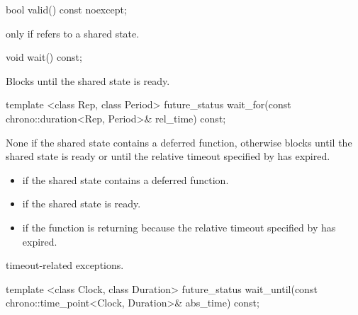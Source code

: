 %
\begin{itemdecl}
bool valid() const noexcept;
\end{itemdecl}

\begin{itemdescr}
\pnum
\returns {} only if  refers to a shared state.
\end{itemdescr}

%
\begin{itemdecl}
void wait() const;
\end{itemdecl}

\begin{itemdescr}
\pnum
\effects
Blocks until the shared state is ready.
\end{itemdescr}

%
\begin{itemdecl}
template <class Rep, class Period>
  future_status wait_for(const chrono::duration<Rep, Period>& rel_time) const;
\end{itemdecl}

\begin{itemdescr}
\pnum
\effects
None if the shared state contains a deferred function,
otherwise
blocks until the shared state is ready or until
the relative timeout specified by  has expired.

\pnum
\returns

\begin{itemize}
\item {} if the shared state contains a deferred
function.

\item {} if the shared state is ready.

\item {} if the function is returning because the
relative timeout
specified by  has expired.
\end{itemize}

\pnum
\throws
timeout-related exceptions.
\end{itemdescr}

%
\begin{itemdecl}
template <class Clock, class Duration>
  future_status wait_until(const chrono::time_point<Clock, Duration>& abs_time) const;
\end{itemdecl}

